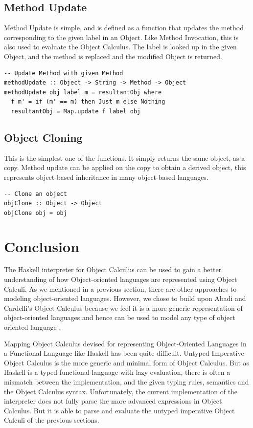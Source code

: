 \documentclass[10pt,twocolumn]{article}
\begin{document}
\subsection{Method Update}
Method Update is simple, and is defined as a function that updates the method corresponding to the given label in an Object. Like Method Invocation, this is also used to evaluate the Object Calculus. The label is looked up in the given Object, and the method is replaced and the modified Object is returned. 
\begin{lstlisting}
-- Update Method with given Method
methodUpdate :: Object -> String -> Method -> Object
methodUpdate obj label m = resultantObj where
  f m' = if (m' == m) then Just m else Nothing
  resultantObj = Map.update f label obj
\end{lstlisting}

\subsection{Object Cloning}
This is the simplest one of the functions. It simply returns the same object, as a copy. Method update can be applied on the copy to obtain a derived object, this represents object-based inheritance in many object-based languages. 
\begin{lstlisting}
-- Clone an object
objClone :: Object -> Object
objClone obj = obj
\end{lstlisting}

\section{Conclusion}

The Haskell interpreter for Object Calculus can be used to gain a better understanding of how Object-oriented languages are represented using Object Calculi. As we mentioned in a previous section, there are other approaches to modeling object-oriented languages. However, we chose to build upon Abadi and Cardelli's Object Calculus because we feel it is a more generic representation of object-oriented languages and hence can be used to model any type of object oriented language \cite{ex1}. 

Mapping Object Calculus devised for representing Object-Oriented Languages in a Functional Language like Haskell has been quite difficult. Untyped Imperative Object Calculus is the more generic and minimal form of Object Calculus. But as Haskell is a typed functional language with lazy evaluation, there is often a mismatch between the implementation, and the given typing rules, semantics and the Object Calculus syntax. Unfortunately, the current implementation of the interpreter does not fully parse the more advanced expressions in Object Calculus. But it is able to parse and evaluate the untyped imperative Object Calculi of the previous sections. 
\end{document}

